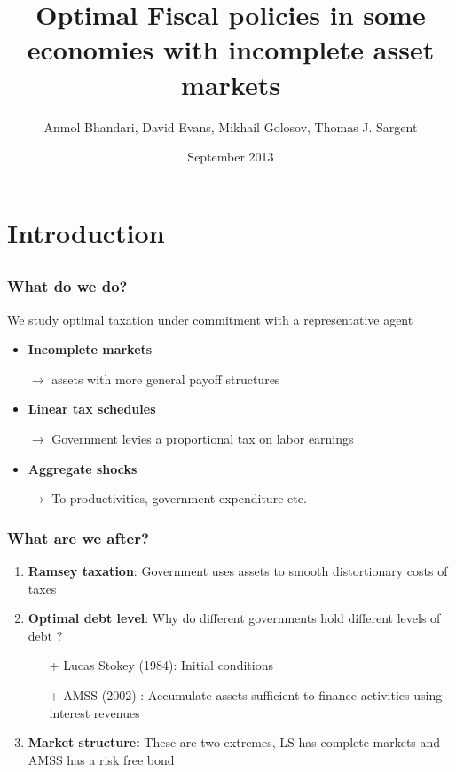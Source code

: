 \documentclass{beamer}
\title { Optimal Fiscal policies in some economies with incomplete asset markets}
\author{Anmol Bhandari, David Evans, Mikhail Golosov, Thomas J. Sargent}
\date{September 2013}
\begin{document}
%
\begin{frame}
\titlepage

\end{frame}
\section{Introduction}
\subsection{}
\begin{frame}
\frametitle{What do we do?}
We study optimal taxation under commitment with a representative agent
\begin{itemize}
 
 \item \textbf{Incomplete markets}

 \quad \color{red}$\rightarrow$ \color{black} assets with more general payoff structures

 \item \textbf{Linear tax schedules}

 \quad \color{red}$\rightarrow$ \color{black}Government levies a proportional tax on labor earnings 

 \item \textbf{Aggregate shocks}

 \quad \color{red}$\rightarrow$ \color{black} To productivities, government expenditure etc.

 \end{itemize}
\end{frame}



\begin{frame}
\frametitle{What are we after?}

\begin{enumerate}
\item \textbf{Ramsey taxation}: Government uses assets to smooth distortionary costs of taxes
\item \textbf{Optimal debt level}: Why do different governments hold different levels of debt ?
\begin{itemize}
 \item [+] Lucas Stokey (1984): Initial conditions
 \item [+ ] AMSS (2002) : Accumulate assets sufficient to finance activities using interest revenues
\end{itemize}
\item \textbf{Market structure:} These are two extremes, LS has complete markets and AMSS has a risk free bond
\end{enumerate}
\end{frame}
\end{document}
